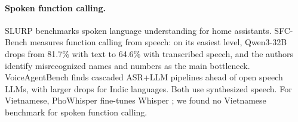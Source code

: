 \paragraph{Spoken function calling.}
SLURP \citep{bastianelli2020slurp} benchmarks spoken language understanding for home assistants. SFC-Bench
\citep{peng2026sfc} measures function calling from speech: on its easiest level, Qwen3-32B drops from 81.7\% with text to
64.6\% with transcribed speech, and the authors identify misrecognized names and numbers as the main bottleneck.
VoiceAgentBench \citep{jain2025voiceagentbench} finds cascaded ASR+LLM pipelines ahead of open speech LLMs, with larger drops
for Indic languages. Both use synthesized speech. For Vietnamese, PhoWhisper \citep{le2024phowhisper} fine-tunes Whisper
\citep{radford2023whisper}; we found no Vietnamese benchmark for spoken function calling.
